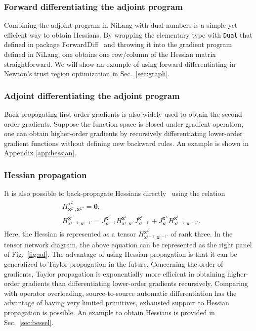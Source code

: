 \documentclass[aps,twocolumn,longbibliography,english,superscriptaddress]{revtex4-1}
\newcommand{\<}{\langle}
\renewcommand{\>}{\rangle}
\newcommand{\out}{{\vx^L}}
\newcommand{\vx}{{\mathbf{x}}}
\newcommand{\Fig}[1]{Fig.~\ref{#1}}
\newcommand{\Sec}[1]{Sec.~\ref{#1}}
\newcommand{\App}[1]{Appendix \ref{#1}}
\theoremstyle{definition}\newtheorem{definition}{\textit{Definition}}
\begin{document}
\subsubsection{Forward differentiating the adjoint program}\label{sec:dualhessian}
Combining the adjoint program in NiLang with dual-numbers is a simple yet efficient way to obtain Hessians.
By wrapping the elementary type with \texttt{Dual} that defined in package ForwardDiff~\cite{Revels2016} and throwing it into the gradient program defined in NiLang,
one obtains one row/column of the Hessian matrix straightforward.
We will show an example of using forward differentiating in Newton's trust region optimization in \Sec{sec:graph}.

\subsubsection{Adjoint differentiating the adjoint program}\label{sec:simplehessian}
Back propagating first-order gradients is also widely used to obtain the second-order gradients. Suppose the function space is closed under gradient operation, one can obtain higher-order gradients by recursively differentiating lower-order gradient functions without defining new backward rules. An example is shown in \App{app:hessian}.

\subsubsection{Hessian propagation}\label{sec:taylor}
It is also possible to back-propagate Hessians directly~\cite{Martens2012} using the relation
\begin{align}
    \begin{split}
        &H^{\out}_{\vx^{L'},\vx^{L''}} = \mathbf{0},\\
        &H^{\out}_{\vx^{i-1},\vx^{i-1'}} = J^{\vx^i}_{\vx^{i-1}} H^{\out}_{\vx^i, \vx^{i'}} J^{\vx^{i'}}_{\vx^{i-1'}} + J^{\out}_{\vx^i} H^{\vx^i}_{\vx^{i-1}, \vx^{i-1'}}.
    \end{split}
\end{align}
Here, the Hessian is represented as a tensor $H^{\out}_{\vx^{i-1},\vx^{i-1'}}$ of rank three.
In the tensor network diagram, the above equation can be represented as the right panel of \Fig{fig:ad}.
The advantage of using Hessian propagation is that it can be generalized to Taylor propagation in the future.
Concerning the order of gradients, Taylor propagation is exponentially more efficient in obtaining higher-order gradients than differentiating lower-order gradients recursively. %
Comparing with operator overloading, source-to-source automatic differentiation has the advantage of having very limited primitives, exhausted support to Hessian propagation is possible.
An example to obtain Hessians is provided in \Sec{sec:bessel}.
\end{document}
